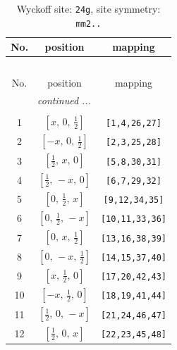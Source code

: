 \documentclass[fleqn,8pt]{jsarticle}
\begin{document}
\begin{longtable}{ccc}
\caption{Wyckoff site: {\tt 24g}, site symmetry: {\tt mm2..}}
 \\
 \hline \hline
No. & position & mapping \\ \hline \endfirsthead

\multicolumn{2}{l}{\tablename\ \thetable{}} \\
 \hline \hline
No. & position & mapping \\ \hline \endhead

 \hline \hline
\multicolumn{2}{r}{\footnotesize\it continued ...} \\ \endfoot

 \hline \hline
\multicolumn{2}{r}{} \\ \endlastfoot

1 & $\left[ x,\, 0,\, \frac{1}{2} \right]$ & {\tt [1,4,26,27]} \\ \hline
2 & $\left[ - x,\, 0,\, \frac{1}{2} \right]$ & {\tt [2,3,25,28]} \\ \hline
3 & $\left[ \frac{1}{2},\, x,\, 0 \right]$ & {\tt [5,8,30,31]} \\ \hline
4 & $\left[ \frac{1}{2},\, - x,\, 0 \right]$ & {\tt [6,7,29,32]} \\ \hline
5 & $\left[ 0,\, \frac{1}{2},\, x \right]$ & {\tt [9,12,34,35]} \\ \hline
6 & $\left[ 0,\, \frac{1}{2},\, - x \right]$ & {\tt [10,11,33,36]} \\ \hline
7 & $\left[ 0,\, x,\, \frac{1}{2} \right]$ & {\tt [13,16,38,39]} \\ \hline
8 & $\left[ 0,\, - x,\, \frac{1}{2} \right]$ & {\tt [14,15,37,40]} \\ \hline
9 & $\left[ x,\, \frac{1}{2},\, 0 \right]$ & {\tt [17,20,42,43]} \\ \hline
10 & $\left[ - x,\, \frac{1}{2},\, 0 \right]$ & {\tt [18,19,41,44]} \\ \hline
11 & $\left[ \frac{1}{2},\, 0,\, - x \right]$ & {\tt [21,24,46,47]} \\ \hline
12 & $\left[ \frac{1}{2},\, 0,\, x \right]$ & {\tt [22,23,45,48]} \\
\end{longtable}
\renewcommand{\arraystretch}{1.2}
\end{document}
